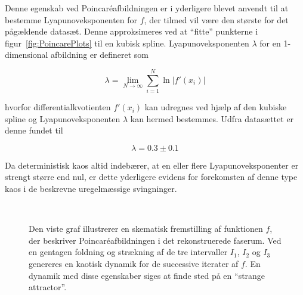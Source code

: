 \vspace{4.0mm}
Denne egenskab ved Poincar\'{e}afbild\-ningen er i
\cite{Swinney} yderligere blevet anvendt til at bestemme
Lyapunoveksponenten for $f$, der tilmed vil v{\ae}re den
st{\o}rste for det p{\aa}g{\ae}ldende datas{\ae}t. Denne
approksimeres ved at ``fitte'' punkterne i
figur~\ref{fig:PoincarePlots} til en kubisk spline.
Lyapunoveksponenten $\lambda$ for en 1-dimensional
afbild\-ning er defineret som

\begin{equation}
  \lambda = \lim_{N \rightarrow \infty} 
            \sum_{i=1}^N \ln |f'(x_i)|
  \label{eq:LyaExp}
\end{equation}

hvorfor differentialkvotienten $f'(x_i)$ kan udregnes ved
hj{\ae}lp af den kubiske spline og Lyapunoveksponenten
$\lambda$ kan hermed bestemmes. Udfra datas{\ae}ttet er
denne fundet til 

\begin{equation}
  \lambda = 0.3 \pm 0.1
\end{equation}

Da deterministisk kaos altid indeb{\ae}rer, at en eller
flere Lyapunoveksponenter er strengt st{\o}rre end nul, er
dette yderligere evidens for forekomsten af denne type kaos
i de beskrevne uregelm{\ae}ssige svingninger.

\renewcommand{\capfont}{\bf}
\begin{figure}[t]
 \begin{minipage}{6cm}
  
 \end{minipage}
 \ \hfill \
 \protect\vspace{-0.5cm}
 \begin{minipage}{7cm}
  \caption{\protect\capsize
   Den viste graf illu\-strerer en ske\-ma\-tisk
   frem\-stil\-ling af funktionen $f$, der be\-skri\-ver
   Poincar\'{e}afbild\-ningen i det re\-kon\-stru\-erede
   faserum. Ved en gentagen foldning og str{\ae}kning af de
   tre intervaller $I_1$, $I_2$ og $I_3$ genereres en
   kaotisk dynamik for de successive iterater af $f$. En
   dynamik med disse egenskaber siges at finde sted p{\aa}
   en ``strange attractor''.\protect\vspace*{\fill}}
 \end{minipage}
 \label{fig:StrechFold}
 \normalsize
\vspace{5mm}
\end{figure}
\renewcommand{\capfont}{\rm}

